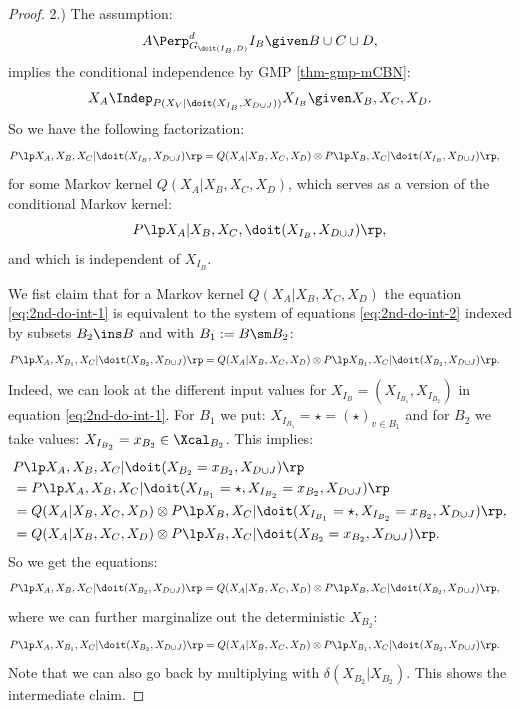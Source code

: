 \begin{Prp}
\begin{proof}
2.) The assumption:
            \[ A \Perp^d_{G_{\doit(I_B,D)}} I_B \given B \cup C \cup D,   \]
implies the conditional independence by GMP \ref{thm-gmp-mCBN}:
  \[ X_A \Indep_{P(X_V|\doit(X_{I_B},X_{D\cup J}))} X_{I_B} \given X_B,X_C,X_D.\]
So we have the following factorization:
\begin{align}
    P\lp X_A,X_B,X_C|\doit(X_{I_B},X_{D\cup J})\rp &= Q(X_A|X_B,X_C,X_D) \otimes P\lp X_B,X_C|\doit(X_{I_B},X_{D\cup J})\rp,\label{eq:2nd-do-int-1}  
\end{align}
for some Markov kernel $Q(X_A|X_B,X_C,X_D)$, which serves as a version of the conditional Markov kernel:
  \[P\lp X_A|X_B,X_C,\doit(X_{I_B},X_{D\cup J})\rp,\]
and which is independent of $X_{I_B}$.

We fist claim that for a Markov kernel $Q(X_A|X_B,X_C,X_D)$ the equation \ref{eq:2nd-do-int-1} is equivalent to the system of equations \ref{eq:2nd-do-int-2} indexed by subsets $B_2 \ins B$ and with $B_1 := B \sm B_2$:
\begin{align}
    P\lp X_A,X_{B_1},X_C|\doit(X_{B_2},X_{D\cup J})\rp &= Q(X_A|X_B,X_C,X_D) \otimes P\lp X_{B_1},X_C|\doit(X_{B_2},X_{D\cup J})\rp. \label{eq:2nd-do-int-2} 
\end{align}
Indeed, we can look at the different input values for
$X_{I_{B}} = (X_{I_{B_1}},X_{I_{B_2}})$ in equation \ref{eq:2nd-do-int-1}.
For $B_1$ we put: $X_{I_{B_1}}= \star = (\star)_{v \in B_1}$ and for $B_2$ we take values: 
$X_{I_{B_2}}=x_{B_2} \in \Xcal_{B_2}$.
This implies: 
\begin{align*} 
  & P\lp X_A,X_B,X_C|\doit(X_{{B_2}}=x_{B_2},X_{D\cup J})\rp \\
  &= P\lp X_A,X_B,X_C|\doit(X_{I_{B_1}}=\star,X_{I_{B_2}}=x_{B_2},X_{D\cup J})\rp \\
  &= Q(X_A|X_B,X_C,X_D) \otimes P\lp X_B,X_C|\doit(X_{I_{B_1}}=\star,X_{I_{B_2}}=x_{B_2},X_{D\cup J})\rp,\\
  &= Q(X_A|X_B,X_C,X_D) \otimes P\lp X_B,X_C|\doit(X_{{B_2}}=x_{B_2},X_{D\cup J})\rp.
\end{align*}
So we get the equations:
\begin{align*}
    P\lp X_A,X_B,X_C|\doit(X_{B_2},X_{D\cup J})\rp 
  &= Q(X_A|X_B,X_C,X_D) \otimes P\lp X_B,X_C|\doit(X_{B_2},X_{D\cup J})\rp, 
\end{align*}
  where we can further marginalize out the deterministic $X_{B_2}$:
  \begin{align*} P\lp X_A,X_{B_1},X_C|\doit(X_{B_2},X_{D\cup J})\rp 
  &= Q(X_A|X_B,X_C,X_D) \otimes P\lp X_{B_1},X_C|\doit(X_{B_2},X_{D\cup J})\rp. %
  \end{align*}
  Note  that we can also go back by multiplying with $\delta(X_{B_2}|X_{B_2})$. This shows the intermediate claim.


\end{proof}
\end{Prp}
